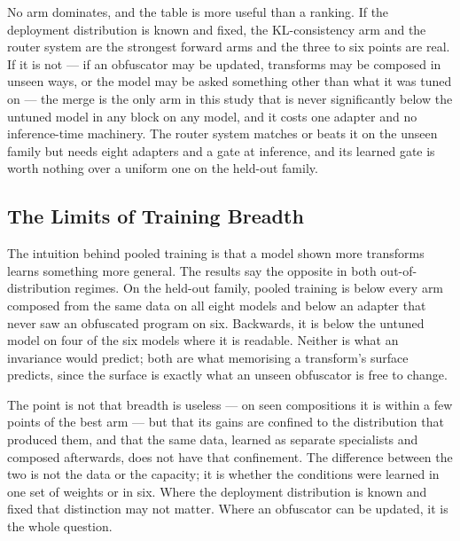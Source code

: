 No arm dominates, and the table is more useful than a ranking. If the deployment distribution is known
and fixed, the KL-consistency arm and the router system are the strongest forward arms and the three to six
points are real. If it is not --- if an obfuscator may be updated, transforms may be composed in
unseen ways, or the model may be asked something other than what it was tuned on --- the merge is the
only arm in this study that is never significantly below the untuned model in any block on any model,
and it costs one adapter and no inference-time machinery. The router system matches or beats it on the unseen
family but needs eight adapters and a gate at inference, and its learned gate is worth nothing over a
uniform one on the held-out family.

\subsection{The Limits of Training Breadth}
The intuition behind pooled training is that a model shown more transforms learns something more
general. The results say the opposite in both out-of-distribution regimes. On the held-out family,
pooled training is below every arm composed from the same data on all eight models and below an
adapter that never saw an obfuscated program on six. Backwards, it is below the untuned model on four
of the six models where it is readable. Neither is what an invariance would predict; both are what
memorising a transform's surface predicts, since the surface is exactly what an unseen obfuscator is
free to change.

The point is not that breadth is useless --- on seen compositions it is within a few points of the
best arm --- but that its gains are confined to the distribution that produced them, and that the
same data, learned as separate specialists and composed afterwards, does not have that confinement.
The difference between the two is not the data or the capacity; it is whether the conditions were
learned in one set of weights or in six. Where the deployment distribution is known and fixed that
distinction may not matter. Where an obfuscator can be updated, it is the whole question.

